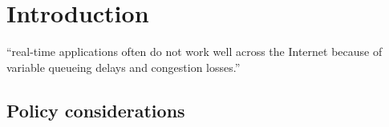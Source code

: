 \section{Introduction}

\label{sec:intro}

``real-time applications often do not work well across the Internet
because of variable queueing delays and congestion losses.''\cite{rfc1633}

\subsection{Policy considerations}
